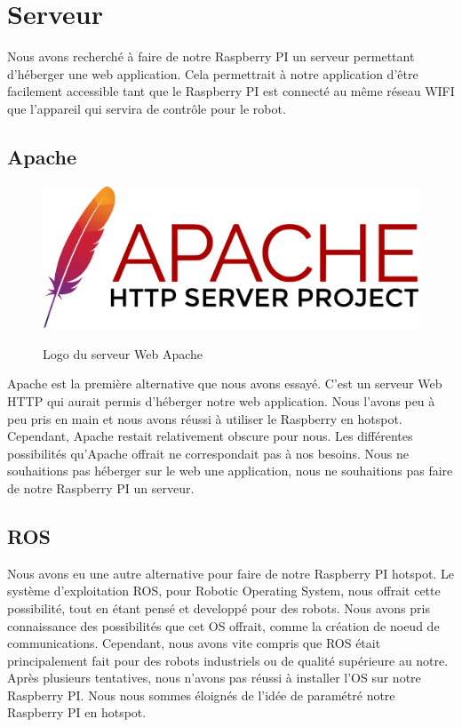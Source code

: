 \documentclass[
	a4paper,									%
	11pt,										%
	twoside,									%
	openright,									%
	notitlepage,									%
	parskip=half,								%
]{scrreprt}										%
\begin{document}
\chapter{Serveur}

Nous avons recherché à faire de notre Raspberry PI un serveur permettant d'héberger une web application.
Cela permettrait à notre application d'être facilement accessible tant que le Raspberry PI est connecté au même réseau
WIFI que l'appareil qui servira de contrôle pour le robot. \par

\section{Apache}

\begin{figure}[!ht]
	\centering
	\includegraphics[scale=.1]{img/Apache.png}
	\label{Apache}
	\caption{Logo du serveur Web Apache}
\end{figure}

Apache est la première alternative que nous avons essayé. C'est un serveur Web HTTP qui aurait permis d'héberger notre web
application. Nous l'avons peu à peu pris en main et nous avons réussi à utiliser le Raspberry en hotspot. Cependant, Apache 
restait relativement obscure pour nous. Les différentes possibilités qu'Apache offrait ne correspondait pas à nos besoins. 
Nous ne souhaitions pas héberger sur le web une application, nous ne souhaitions pas faire de notre Raspberry PI un serveur. \par

\section{ROS}

Nous avons eu une autre alternative pour faire de notre Raspberry PI hotspot. Le système d'exploitation ROS, pour Robotic Operating System, 
nous offrait cette possibilité, tout en étant pensé et developpé pour des robots. Nous avons pris connaissance des possibilités 
que cet OS offrait, comme la création de noeud de communications. Cependant, nous avons vite compris que ROS était principalement
fait pour des robots industriels ou de qualité supérieure au notre. Après plusieurs tentatives, nous n'avons pas réussi à installer 
l'OS sur notre Raspberry PI. Nous nous sommes éloignés de l'idée de paramétré notre Raspberry PI en hotspot. \par
\end{document}
